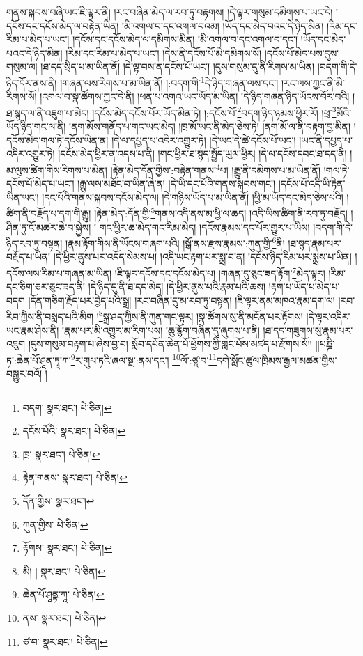 གནས་སྐབས་བཞི་ཡང་ཇི་ལྟར་ནི། །རང་བཞིན་མེད་ལ་རབ་ཏུ་བརྟགས། །དེ་ལྟར་གསུམ་དམིགས་པ་ཡང་དེ། །དངོས་དང་དངོས་མེད་ལ་བརྟེན་ཡིན། །མི་འགལ་བ་དང་འགལ་བའམ། །ཡོད་དང་མེད་བའང་དེ་ཉིད་མིན། །རིམ་དང་རིམ་པ་མེད་པ་ཡང་། །དངོས་དང་དངོས་མེད་ལ་དམིགས་མིན། །མི་འགལ་བ་དང་འགལ་བ་དང་། །ཡོད་དང་མེད་པའང་དེ་ཉིད་མིན། །རིམ་དང་རིམ་པ་མེད་པ་ཡང་། །དེས་ནི་དངོས་པོ་མི་དམིགས་སོ། །དངོས་པོ་མེད་པས་དུས་གསུམ་ལ། །ཐ་དད་སྲིད་པ་མ་ཡིན་ནོ། །དེ་ལྟ་བས་ན་དངོས་པོ་ཡང་། །དུས་གསུམ་དུ་ནི་རིགས་མ་ཡིན། །བདག་གི་དེ་ཉིད་དོར་ནས་ནི། །གཞན་ལས་རིགས་པ་མ་ཡིན་ནོ། །:བདག་གི་\footnote{བདག་  སྣར་ཐང་།  པེ་ཅིན། }དེ་ཉིད་གཞན་ལས་དང་། །རང་ལས་ཀྱང་ནི་མི་རིགས་སོ། །འགལ་བ་སྣ་ཚོགས་ཀྱང་དེ་ནི། །ཕན་པ་འགའ་ཡང་ཡོད་མ་ཡིན། །དེ་ཉིད་གཞན་ཉིད་ཡོངས་བོར་བའི། །ཐ་སྙད་ལ་ནི་འཇུག་པ་མེད། །དངོས་མེད་དངོས་པོར་ཡོད་མིན་ཏེ། །:དངོས་པོ་\footnote{དངོས་པོའི་  སྣར་ཐང་།  པེ་ཅིན། }བདག་ཉིད་ཉམས་ཕྱིར་རོ། །ཕྲ་\footnote{ཁྲ་  སྣར་ཐང་།  པེ་ཅིན། }མོའི་ཡོད་ཉིད་གང་ལ་ནི། །ནག་མོས་གནོད་པ་གང་ཡང་མེད། །ཁྲ་མོ་ཡང་ནི་མེད་ཅེས་ཏེ། །ནག་མོ་ལ་ནི་བརྟག་བྱ་མིན། །དངོས་མེད་གལ་ཏེ་དངོས་ཡིན་ན། །དེ་ལ་དཔྱད་པ་འདིར་འགྱུར་ཏེ། །དེ་ཡང་དེ་ཚེ་དངོས་པོ་ཡང་། །ཡང་ནི་དཔྱད་པ་འདིར་འགྱུར་ཏེ། །དངོས་མེད་ཕྱིར་ན་འདས་པ་ནི། །གང་ཕྱིར་ཐ་སྙད་སྤྱོད་ཡུལ་ཕྱིར། །དེ་ལ་དངོས་དབང་ཐ་དད་ནི། །མ་ལུས་ཚིག་གིས་རིགས་པ་མིན། །རྟེན་མེད་དོན་གྱིས་:བརྟེན་གནས་\footnote{རྟེན་གནས་  སྣར་ཐང་།  པེ་ཅིན། }པ། །རྒྱུ་ནི་དམིགས་པ་མ་ཡིན་ནོ། །གལ་ཏེ་དངོས་པོ་མེད་པ་ཡང་། །རྒྱུ་ལས་མཐོང་བ་ཡིན་ཞེ་ན། །དེ་ཡི་དང་པོའི་གནས་སྐབས་གང་། །དངོས་པོ་འདི་ཡི་རྟེན་ཡིན་ཡང་། །དང་པོའི་གནས་སྐབས་དངོས་མེད་ལ། །དེ་གཉིས་ཡོད་པ་མ་ཡིན་ནོ། །ཕྱི་མ་ཡོད་དང་མེད་ཅེས་པའི། །ཚིག་ནི་བརྗོད་པ་དག་གི་རྒྱུ། །རྟེན་མེད་:དོན་གྱི་\footnote{དོན་གྱིས་  སྣར་ཐང་། }གནས་འདི་ནས་མ་ཕྱི་ལ་ཆད། །འདི་ཡིས་ཚིག་ནི་རབ་ཏུ་བརྗོད། །ཤིན་ཏུ་ངོ་མཚར་ཆེ་བ་སྐྱེས། །
གང་ཕྱིར་ཆ་མེད་གང་རིམ་མེད། །དངོས་རྣམས་དང་པོར་གྱུར་པ་ཡིས། །བདག་གི་དེ་ཉིད་རབ་ཏུ་བསྟན། །རྣམ་རྟོག་གིས་ནི་ཡོངས་གཞག་པའི། །སྒོ་ནས་རྫས་རྣམས་:ཀུན་གྱི་\footnote{ཀུན་གྱིས་  པེ་ཅིན། }ནི། །ཐ་སྙད་རྣམ་པར་བརྗོད་པ་ཡིན། །དེ་ཕྱིར་ནུས་པར་འདོད་སེམས་པ། །འདི་ཡང་རྟག་པར་སྨྲ་བ་ན། །དངོས་ཉིད་རིམ་པར་སྨྲས་པ་ཡིན། །དངོས་ལས་རིམ་པ་གཞན་མ་ཡིན། །ཇི་ལྟར་དངོས་དང་དངོས་མེད་པ། །གཞན་དུ་ཅུང་ཟད་རྟོག་\footnote{རྟོགས་  སྣར་ཐང་།  པེ་ཅིན། }མེད་ལྟར། །རིམ་དང་ཅིག་ཅར་ཅུང་ཟད་ནི། །དེ་ཉིད་དུ་ནི་ཐ་དད་མེད། །དེ་ཕྱིར་ནུས་པའི་རྣམ་པའི་ཆས། །རྟག་པ་ཡོད་པ་མེད་པ་བདག །དོན་གཅིག་རྗོད་པར་བྱེད་པའི་སྒྲ། །རང་བཞིན་དུ་མ་རབ་ཏུ་བསྟན། །ཇི་ལྟར་ནམ་མཁའ་རྣམ་དག་ལ། །རབ་རིབ་ཀྱིས་ནི་བསླད་པའི་མིག །\footnote{མི། །  སྣར་ཐང་།  པེ་ཅིན། }སྐྲ་ཤད་ཀྱིས་ནི་ཀུན་གང་ལྟར། །སྣ་ཚོགས་སུ་ནི་མངོན་པར་རྟོགས། །དེ་ལྟར་འདིར་ཡང་རྣམ་ཤེས་ནི། །རྣམ་པར་མི་འགྱུར་མ་རིག་པས། །ཆུ་རྙོག་བཞིན་དུ་ཞུགས་པ་ནི། །ཐ་དད་གཟུགས་སུ་རྣམ་པར་འཇུག །དུས་གསུམ་བརྟག་པ་ཞེས་བྱ་བ། སློབ་དཔོན་ཆེན་པོ་ཕྱོགས་ཀྱི་གླང་པོས་མཛད་པ་རྫོགས་སོ།། །།པཎྜི་ཏ་:ཆེན་པོ་ཤཱན་ཏཱ་ཀ་\footnote{ཆེན་པོ་ཤཱནྟ་ཀཱ་  པེ་ཅིན། }ར་གུཔ་ཏའི་ཞལ་སྔ་:ནས་དང་། \footnote{ནས་  སྣར་ཐང་།  པེ་ཅིན། }ལོ་:ཙཱ་བ་\footnote{ཙ་བ་  སྣར་ཐང་།  པེ་ཅིན། }དགེ་སློང་ཚུལ་ཁྲིམས་རྒྱལ་མཚན་གྱིས་བསྒྱུར་བའོ། ། 